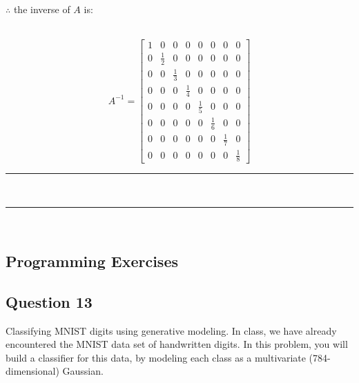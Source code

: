 \documentclass{article}
\begin{document}
\parbox{\textwidth}{$\therefore$ the inverse of $A$ is:}\\
$$A^{-1} = \begin{bmatrix}
    1 & 0 & 0 & 0 & 0 & 0 & 0 & 0 \\
    0 & \frac{1}{2} & 0 & 0 & 0 & 0 & 0 & 0 \\
    0 & 0 & \frac{1}{3} & 0 & 0 & 0 & 0 & 0 \\
    0 & 0 & 0 & \frac{1}{4} & 0 & 0 & 0 & 0 \\
    0 & 0 & 0 & 0 & \frac{1}{5} & 0 & 0 & 0 \\
    0 & 0 & 0 & 0 & 0 & \frac{1}{6} & 0 & 0 \\
    0 & 0 & 0 & 0 & 0 & 0 & \frac{1}{7} & 0 \\
    0 & 0 & 0 & 0 & 0 & 0 & 0 & \frac{1}{8}
\end{bmatrix}$$
\noindent\rule{\textwidth}{0.4pt}\\
\noindent\rule{\textwidth}{0.4pt}\\

\newpage

\subsection*{Programming Exercises}

\subsection*{Question 13}
\parbox{\textwidth}{Classifying MNIST digits using generative modeling. In class, we have already encountered the MNIST data set of handwritten digits.
In this problem, you will build a classifier for this data, by modeling each class as a multivariate (784-dimensional) Gaussian.}
\end{document}
